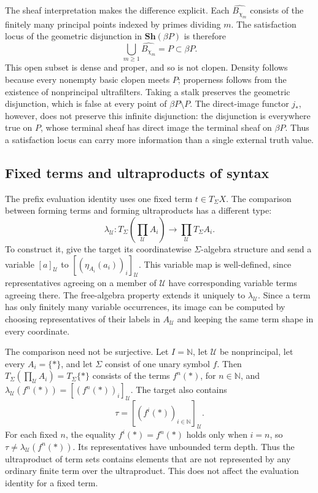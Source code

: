 \documentclass[11pt]{article}
\begin{document}
The sheaf interpretation makes the difference explicit.
Each \(\widehat{B_{\chi_m}}\) consists of the finitely many principal
points indexed by primes dividing \(m\). The satisfaction locus of the
geometric disjunction in \(\mathbf{Sh}(\beta P)\) is therefore
\[
\bigcup_{m\geq1}\widehat{B_{\chi_m}}=P\subset\beta P.
\]
This open subset is dense and proper, and so is not clopen. Density
follows because every nonempty basic clopen meets \(P\); properness
follows from the existence of nonprincipal ultrafilters.
Taking a stalk preserves the geometric disjunction, which is false at
every point of \(\beta P\setminus P\).
The direct-image functor \(j_*\), however, does not preserve this
infinite disjunction: the disjunction is everywhere true on \(P\),
whose terminal sheaf has direct image the terminal sheaf on \(\beta P\).
Thus a satisfaction locus can carry more information than a single
external truth value.

\subsection{Fixed terms and ultraproducts of syntax}

The prefix evaluation identity uses one fixed term
\(t\in T_\Sigma X\). The comparison between forming terms and forming
ultraproducts has a different type:
\[
\lambda_{\mathcal U}:
T_\Sigma\!\left(\prod_{\mathcal U}A_i\right)
\longrightarrow
\prod_{\mathcal U}T_\Sigma A_i.
\]
To construct it, give the target its coordinatewise
\(\Sigma\)-algebra structure and send a variable
\([a]_{\mathcal U}\) to
\([(\eta_{A_i}(a_i))_i]_{\mathcal U}\).
This variable map is well-defined, since representatives agreeing on
a member of \(\mathcal U\) have corresponding variable terms agreeing
there. The free-algebra property extends it uniquely to
\(\lambda_{\mathcal U}\).
Since a term has only finitely many variable occurrences, its image can
be computed by choosing representatives of their labels in
\(A_{\mathcal U}\) and keeping the same term shape in every coordinate.

The comparison need not be surjective. Let \(I=\mathbb N\), let
\(\mathcal U\) be nonprincipal, let every \(A_i=\{*\}\), and let
\(\Sigma\) consist of one unary symbol \(f\). Then
\(T_\Sigma(\prod_{\mathcal U}A_i)=T_\Sigma\{*\}\) consists of the terms
\(f^n(*)\), for \(n\in\mathbb N\), and
\(\lambda_{\mathcal U}(f^n(*))=[(f^n(*))_i]_{\mathcal U}\).
The target also contains
\[
\tau=[(f^i(*))_{i\in\mathbb N}]_{\mathcal U}.
\]
For each fixed \(n\), the equality \(f^i(*)=f^n(*)\) holds only when
\(i=n\), so \(\tau\neq\lambda_{\mathcal U}(f^n(*))\).
Its representatives have unbounded term depth.
Thus the ultraproduct of term sets contains elements that are not
represented by any ordinary finite term over the ultraproduct.
This does not affect the evaluation identity for a fixed term.
\end{document}
